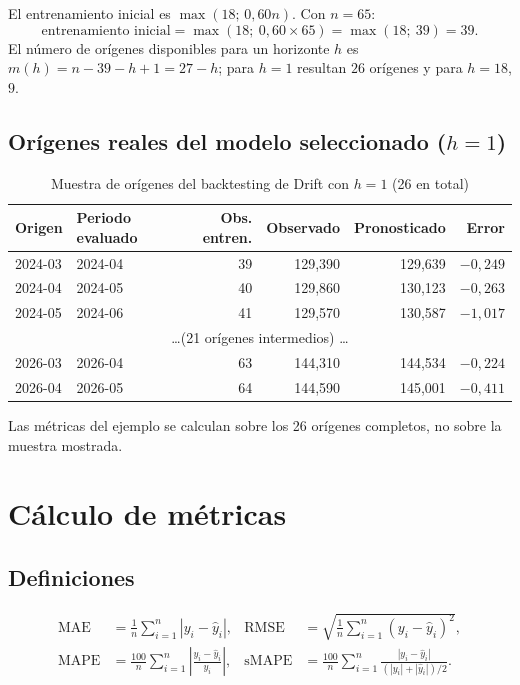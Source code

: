 \documentclass[11pt,letterpaper]{article}
\begin{document}
El entrenamiento inicial es \(\max(18;\,0{,}60n)\). Con \(n=65\):
\begin{equation}
\text{entrenamiento inicial}=\max(18;\ 0{,}60\times 65)=\max(18;\ 39)=39 .
\end{equation}
El número de orígenes disponibles para un horizonte \(h\) es
\(m(h)=n-39-h+1=27-h\); para \(h=1\) resultan \(26\) orígenes y para \(h=18\),
\(9\).

\subsection{Orígenes reales del modelo seleccionado (\(h=1\))}

\begin{table}[H]
\centering
\caption{Muestra de orígenes del backtesting de Drift con \(h=1\) (26 en total)}
\begin{tabular}{@{}llrrrr@{}}
\toprule
\textbf{Origen} & \textbf{Periodo evaluado} & \textbf{Obs. entren.} & \textbf{Observado} & \textbf{Pronosticado} & \textbf{Error} \\
\midrule
2024-03 & 2024-04 & 39 & 129{,}390 & 129{,}639 & \(-0{,}249\) \\
2024-04 & 2024-05 & 40 & 129{,}860 & 130{,}123 & \(-0{,}263\) \\
2024-05 & 2024-06 & 41 & 129{,}570 & 130{,}587 & \(-1{,}017\) \\
\multicolumn{6}{c}{\dots (21 orígenes intermedios) \dots} \\
2026-03 & 2026-04 & 63 & 144{,}310 & 144{,}534 & \(-0{,}224\) \\
2026-04 & 2026-05 & 64 & 144{,}590 & 145{,}001 & \(-0{,}411\) \\
\bottomrule
\end{tabular}
\end{table}

Las métricas del ejemplo se calculan sobre los 26 orígenes completos, no sobre
la muestra mostrada.

\section{Cálculo de métricas}

\subsection{Definiciones}

\begin{align}
\mathrm{MAE}&=\frac{1}{n}\sum_{i=1}^{n}|y_i-\hat y_i|, &
\mathrm{RMSE}&=\sqrt{\frac{1}{n}\sum_{i=1}^{n}(y_i-\hat y_i)^2},\\
\mathrm{MAPE}&=\frac{100}{n}\sum_{i=1}^{n}\left|\frac{y_i-\hat y_i}{y_i}\right|, &
\mathrm{sMAPE}&=\frac{100}{n}\sum_{i=1}^{n}\frac{|y_i-\hat y_i|}{(|y_i|+|\hat y_i|)/2}.
\end{align}
\end{document}
